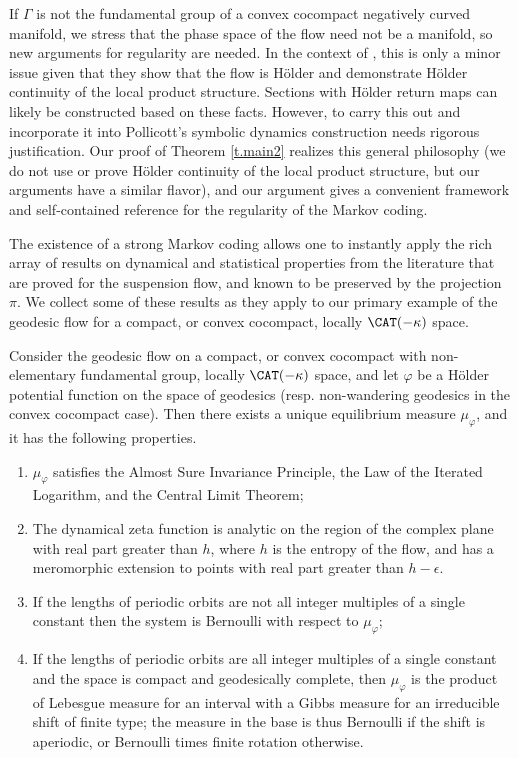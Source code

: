 If $\Gamma$ is not the fundamental group of a convex cocompact negatively curved manifold, we stress that the phase space of the flow need not be a manifold, so new arguments for regularity are needed. In the context of \cite{bcls}, this is only a minor issue given that they show that the flow is Hölder and demonstrate Hölder continuity of the local product structure. Sections with Hölder return maps can likely be constructed based on these facts. However, to carry this out and incorporate it into Pollicott's symbolic dynamics construction needs rigorous justification. Our proof of Theorem \ref{t.main2} realizes this general philosophy (we do not use or prove Hölder continuity of the local product structure, but our arguments have a similar flavor), and our argument gives a convenient framework and self-contained reference for the regularity of the Markov coding.

The existence of a strong Markov coding allows one to instantly apply the rich array of results on dynamical and statistical properties from the literature that are proved for the suspension flow, and known to be preserved by the projection $\pi$. We collect some of these results as they apply to our primary example of the geodesic flow for a compact, or convex cocompact, locally $\CAT(-\kappa)$ space.

\begin{corx}\label{t.applications}
Consider the geodesic flow on a compact, or convex cocompact with non-elementary fundamental group, locally $\CAT(-\kappa)$ space, and let $\varphi$ be a Hölder potential function on the space of geodesics (resp. non-wandering geodesics in the convex cocompact case). Then there exists a unique equilibrium measure $\mu_\varphi$, and it has the following properties.
\begin{enumerate}
\item\label{t.applications1} $\mu_\varphi$ satisfies the Almost Sure Invariance Principle, the Law of the Iterated Logarithm, and the Central Limit Theorem;
\item\label{t.applications2} The dynamical zeta function is analytic on the region of the complex plane with real part greater than $h$, where $h$ is the entropy of the flow, and has a meromorphic extension to points with real part greater than $h- \epsilon$.
\item\label{t.applications3} If the lengths of periodic orbits are not all integer multiples of a single constant then the system is Bernoulli with respect to $\mu_\varphi$;
\item\label{t.applications4} If the lengths of periodic orbits are all integer multiples of a single constant and the space is compact and geodesically complete, then $\mu_\varphi$ is the product of Lebesgue measure for an interval with a Gibbs measure for an irreducible shift of finite type; the measure in the base is thus Bernoulli if the shift is aperiodic, or Bernoulli times finite rotation otherwise.
\end{enumerate}
\end{corx}

